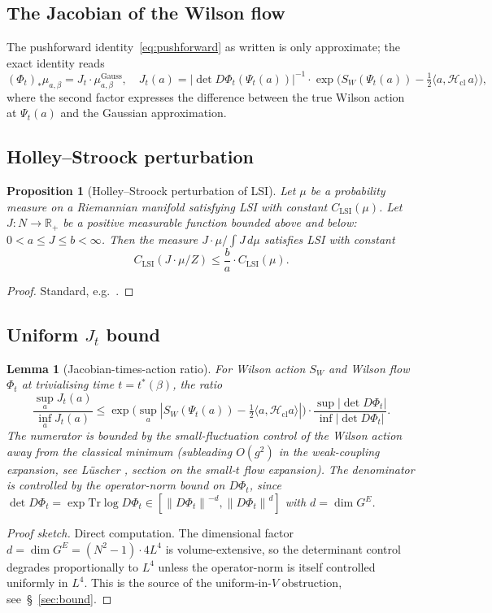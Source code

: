 \documentclass[11pt,a4paper]{amsart}
\newtheorem{lemma}[theorem]{Lemma}
\newtheorem{proposition}[theorem]{Proposition}
\theoremstyle{definition}
\newcommand{\R}{\mathbb{R}}
\newcommand{\norm}[1]{\left\lVert#1\right\rVert}
\newcommand{\abs}[1]{\left\lvert#1\right\rvert}
\newcommand{\Tr}{\mathrm{Tr}}
\begin{document}
\subsection{The Jacobian of the Wilson flow}
The pushforward identity~\eqref{eq:pushforward} as written is only
approximate; the exact identity reads
\begin{equation}\label{eq:Jacobian-id}
(\Phi_t)_* \mu_{a,\beta}
= J_t \cdot \mu^\mathrm{Gauss}_{a,\beta},
\quad
J_t(a) = \abs{\det D\Phi_t(\Psi_t(a))}^{-1}\cdot
\exp\bigl(S_W(\Psi_t(a)) - \tfrac12\langle a, \mathcal H_\mathrm{cl}\,a\rangle\bigr),
\end{equation}
where the second factor expresses the difference between the true Wilson
action at $\Psi_t(a)$ and the Gaussian approximation.

\subsection{Holley--Stroock perturbation}
\begin{proposition}[Holley--Stroock perturbation of LSI]\label{prop:HS}
Let $\mu$ be a probability measure on a Riemannian manifold satisfying
LSI with constant $C_\mathrm{LSI}(\mu)$. Let $J : N \to \R_+$ be a
positive measurable function bounded above and below: $0 < a \leq J \leq
b < \infty$. Then the measure $J\cdot\mu / \int J\,d\mu$ satisfies LSI
with constant
$$
C_\mathrm{LSI}(J\cdot\mu/Z) \leq \frac{b}{a}\cdot C_\mathrm{LSI}(\mu).
$$
\end{proposition}
\begin{proof}
Standard, e.g.~\cite[Prop.~5.4.1]{BakryGentilLedoux2014}.
\end{proof}

\subsection{Uniform $J_t$ bound}
\begin{lemma}[Jacobian-times-action ratio]\label{lem:Jacobian-bound}
For Wilson action $S_W$ and Wilson flow $\Phi_t$ at trivialising time
$t = t^*(\beta)$, the ratio
$$
\frac{\sup_a J_t(a)}{\inf_a J_t(a)}
\leq \exp\bigl(\sup_{a}|S_W(\Psi_t(a)) - \tfrac12\langle a,\mathcal H_\mathrm{cl}a\rangle|\bigr) \cdot \frac{\sup\abs{\det D\Phi_t}}{\inf\abs{\det D\Phi_t}}.
$$
The numerator is bounded by the small-fluctuation control of the Wilson
action away from the classical minimum (subleading $O(g^2)$ in the
weak-coupling expansion, see L\"uscher \cite{Luscher2009TrivializingMaps},
section on the small-$t$ flow expansion). The denominator is controlled
by the operator-norm bound on $D\Phi_t$, since
$\det D\Phi_t = \exp\Tr\log D\Phi_t \in [\norm{D\Phi_t}^{-d},
\norm{D\Phi_t}^d]$ with $d = \dim G^E$.
\end{lemma}
\begin{proof}[Proof sketch]
Direct computation. The dimensional factor $d = \dim G^E = (N^2-1)\cdot
4 L^4$ is volume-extensive, so the determinant control degrades
proportionally to $L^4$ unless the operator-norm is itself controlled
uniformly in $L^4$. This is the source of the uniform-in-$V$
obstruction, see~\S~\ref{sec:bound}.
\end{proof}
\end{document}
